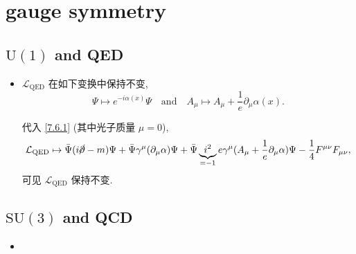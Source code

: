 \chapter{gauge symmetry}
\section{\texorpdfstring{$\mathrm{U}(1)$}{U(1)} and QED}
\begin{itemize}
	\item $\mathcal{L}_\text{QED}$ 在如下变换中保持不变,
	\begin{equation}
		\Psi \mapsto e^{- i \alpha(x)} \Psi \quad \text{and} \quad A_\mu \mapsto A_\mu + \frac{1}{e} \partial_\mu \alpha(x).
	\end{equation}
	
	\begin{tcolorbox}[title=calculation:]
		代入 \eqref{7.6.1} (其中光子质量 $\mu = 0$),
		\begin{equation}
			\mathcal{L}_\text{QED} \mapsto \bar{\Psi} (i \cancel{\partial} - m) \Psi + \bar{\Psi} \gamma^\mu (\partial_\mu \alpha) \Psi + \bar{\Psi} \underbrace{i^2}_{= - 1} e \gamma^\mu (A_\mu + \frac{1}{e} \partial_\mu \alpha) \Psi - \frac{1}{4} F^{\mu \nu} F_{\mu \nu},
		\end{equation}
		可见  $\mathcal{L}_\text{QED}$ 保持不变.
	\end{tcolorbox}
\end{itemize}

\section{\texorpdfstring{$\mathrm{SU}(3)$}{SU(3)} and QCD}
\begin{itemize}
	\item 
\end{itemize}
